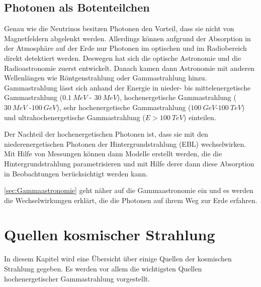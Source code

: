 \subsection{Photonen als Botenteilchen}
\label{subsec:Photonen}
Genau wie die Neutrinos besitzen Photonen den Vorteil, dass sie nicht von Magnetfeldern abgelenkt werden.
Allerdings können aufgrund der Absorption in der Atmosphäre auf der Erde nur Photonen im optischen und im Radiobereich direkt detektiert werden.
Deswegen hat sich die optische Astronomie und die Radioastronomie zuerst entwickelt. 
Danach kamen dann Astronomie mit anderen Wellenlängen wie Röntgenstrahlung oder Gammastrahlung hinzu.
Gammastrahlung lässt sich anhand der Energie in nieder- bis mittelenergetische Gammastrahlung ($\SI{0,1}{MeV}$ - $\SI{30}{MeV}$), hochenergetische Gammastrahlung ($\SI{30}{MeV}$ -$\SI{100}{GeV}$), sehr hochenergetische Gammastrahlung ($\SI{100}{GeV}$-$\SI{100}{TeV}$) und ultrahochenergetische Gammastrahlung ($E>\SI{100}{TeV}$) einteilen.


Der Nachteil der hochenergetischen Photonen ist, dass sie mit den niederenergetischen Photonen der Hintergrundstrahlung (EBL) wechselwirken.
Mit Hilfe von Messungen können dann Modelle erstellt werden, die die Hintergrundstrahlung parametrisieren und mit Hilfe derer dann diese Absorption in Beobachtungen berücksichtigt werden kann.


\autoref{sec:Gammaastronomie} geht näher auf die Gammaastronomie ein und es werden die Wechselwirkungen erklärt, die die Photonen auf ihrem Weg zur Erde erfahren.


\section{Quellen kosmischer Strahlung}
\label{sec:Quellen}
In diesem Kapitel wird eine Übersicht über einige Quellen der kosmischen Strahlung gegeben.
Es werden vor allem die wichtigsten Quellen hochenergetischer Gammastrahlung vorgestellt.

